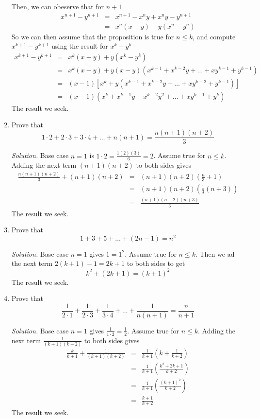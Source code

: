 \documentclass[12pt]{article}
\newcommand\sol[1]{\begin{mdframed}
\emph{Solution.} #1
\end{mdframed}}
\begin{document}
\begin{enumerate}
{      Then, we can obeserve that for $n+1$
      \begin{eqnarray*}
        x^{n+1} - y^{n+1} &=& x^{n+1} - x^ny + x^ny - y^{n+1} \\
        &=& x^n(x-y) + y(x^n-y^n)
      \end{eqnarray*}
      So we can then assume that the proposition is true for $n \le k$, and compute $x^{k+1}-y^{k+1}$ using the result for $x^k-y^k$
      \begin{eqnarray*}
        x^{k+1} - y^{k+1} &=& x^k(x-y) + y(x^k-y^k) \\
        &=& x^k(x-y) + y(x-y)(x^{k-1}+x^{k-2}y +\ldots+xy^{k-1} + y^{k-1}) \\
        &=& (x-1) [x^k + y(x^{k-1}+x^{k-2}y +\ldots+xy^{k-2} + y^{k-1})] \\
        &=& (x-1) (x^k + x^{k-1}y+x^{k-2}y^2 +\ldots+xy^{k-1} + y^{k}) 
      \end{eqnarray*}
      The result we seek.
    }

  \item Prove that
    \[
    1\cdot2 + 2\cdot3 + 3\cdot4 + \ldots+n(n+1) = \frac{n(n+1)(n+2)}{3}
    \]
    \sol{Base case $n=1$ is $1\cdot2 = \frac{1(2)(3)}{6} = 2$. Assume true for $n \le k$. Adding the next term $(n+1)(n+2)$ to both sides gives
      \begin{eqnarray*}
        \frac{n(n+1)(n+2)}{3} + (n+1)(n+2) &=& (n+1)(n+2)\left(\frac{n}{3} + 1\right) \\
        &=& (n+1)(n+2) \left(\frac{1}{3} (n+3)\right) \\
        &=& \frac{(n+1)(n+2)(n+3)}{3}
      \end{eqnarray*}
      The result we seek.}

  \item Prove that
    \[
    1+3+5+\ldots+(2n-1) = n^2
    \]
    \sol{Base case $n=1$ gives $1 = 1^2$. Assume true for $n \le k$. Then we ad the next term $2(k+1)-1 = 2k+1$ to both sides to get
      \[
      k^2 + (2k+1) = (k+1)^2
      \]
      The result we seek.
    }

  \item Prove that
    \[
    \frac{1}{2\cdot1} + \frac{1}{2\cdot3} + \frac{1}{3\cdot4} +\ldots+\frac{1}{n(n+1)} = \frac{n}{n+1}    
    \]
    \sol{Base case $n=1$ gives $\frac{1}{1\cdot 2} = \frac{1}{2}$. Assume true for $n \le k$. Adding the next term $\frac{1}{(k+1)(k+2)}$ to both sides gives
        \begin{eqnarray*}
          \frac{k}{k+1} + \frac{1}{(k+1)(k+2)} &=& \frac{1}{k+1} \left ( k + \frac{1}{k+2} \right) \\
          &=& \frac{1}{k+1} \left ( \frac{k^2 + 2k + 1}{k+2} \right) \\
          &=& \frac{1}{k+1} \left ( \frac{(k+ 1)^2}{k+2} \right) \\
          &=& \frac{k+ 1}{k+2}
        \end{eqnarray*}
        The result we seek.
    }
\end{enumerate}
\end{document}
